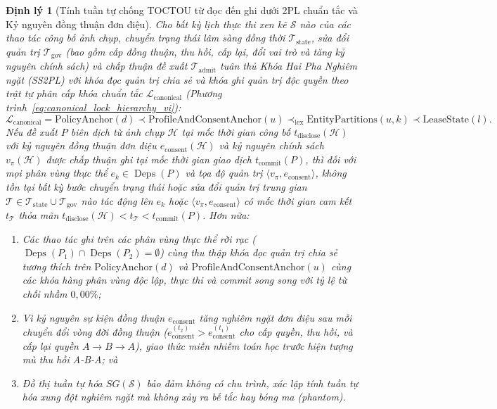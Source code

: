 \documentclass[11pt]{article}
\newtheorem{theorem}{Định lý}
\begin{document}
\begin{theorem}[Tính tuần tự chống TOCTOU từ đọc đến ghi dưới 2PL chuẩn tắc và Kỷ nguyên đồng thuận đơn điệu]
Cho bất kỳ lịch thực thi xen kẽ $\mathcal{S}$ nào của các thao tác công bố ảnh chụp, chuyển trạng thái lâm sàng đồng thời $\mathcal{T}_{\text{state}}$, sửa đổi quản trị $\mathcal{T}_{\text{gov}}$ (bao gồm cấp đồng thuận, thu hồi, cấp lại, đổi vai trò và tăng kỷ nguyên chính sách) và chấp thuận đề xuất $\mathcal{T}_{\text{admit}}$ tuân thủ Khóa Hai Pha Nghiêm ngặt (SS2PL) với khóa đọc quản trị chia sẻ và khóa ghi quản trị độc quyền theo trật tự phân cấp khóa chuẩn tắc $\mathcal{L}_{\text{canonical}}$ (Phương trình~\ref{eq:canonical_lock_hierarchy_vi}):
$$\mathcal{L}_{\text{canonical}} = \text{PolicyAnchor}(d) \prec \text{ProfileAndConsentAnchor}(u) \prec_{\text{lex}} \text{EntityPartitions}(u, k) \prec \text{LeaseState}(l).$$
Nếu đề xuất $P$ biên dịch từ ảnh chụp $\mathcal{H}$ tại mốc thời gian công bố $t_{\text{disclose}}(\mathcal{H})$ với kỷ nguyên đồng thuận đơn điệu $e_{\text{consent}}(\mathcal{H})$ và kỷ nguyên chính sách $v_{\pi}(\mathcal{H})$ được chấp thuận ghi tại mốc thời gian giao dịch $t_{\text{commit}}(P)$, thì đối với mọi phân vùng thực thể $e_k \in \operatorname{Deps}(P)$ và tọa độ quản trị $\langle v_{\pi}, e_{\text{consent}} \rangle$, không tồn tại bất kỳ bước chuyển trạng thái hoặc sửa đổi quản trị trung gian $\mathcal{T} \in \mathcal{T}_{\text{state}} \cup \mathcal{T}_{\text{gov}}$ nào tác động lên $e_k$ hoặc $\langle v_{\pi}, e_{\text{consent}} \rangle$ có mốc thời gian cam kết $t_{\mathcal{T}}$ thỏa mãn $t_{\text{disclose}}(\mathcal{H}) < t_{\mathcal{T}} < t_{\text{commit}}(P)$. Hơn nữa:
\begin{enumerate}[label=(\roman*)]
  \item Các thao tác ghi trên các phân vùng thực thể rời rạc ($\operatorname{Deps}(P_1) \cap \operatorname{Deps}(P_2) = \emptyset$) cùng thu thập khóa đọc quản trị chia sẻ tương thích trên $\text{PolicyAnchor}(d)$ và $\text{ProfileAndConsentAnchor}(u)$ cùng các khóa hàng phân vùng độc lập, thực thi và commit song song với tỷ lệ từ chối nhầm $0{,}00\%$;
  \item Vì kỷ nguyên sự kiện đồng thuận $e_{\text{consent}}$ tăng nghiêm ngặt đơn điệu sau mỗi chuyển đổi vòng đời đồng thuận ($e_{\text{consent}}^{(t_2)} > e_{\text{consent}}^{(t_1)}$ cho cấp quyền, thu hồi, và cấp lại quyền $A \to B \to A$), giao thức miễn nhiễm toán học trước hiện tượng mù thu hồi A-B-A; và
  \item Đồ thị tuần tự hóa $SG(\mathcal{S})$ bảo đảm không có chu trình, xác lập tính tuần tự hóa xung đột nghiêm ngặt mà không xảy ra bế tắc hay bóng ma (phantom).
\end{enumerate}
\end{theorem}
\end{document}
